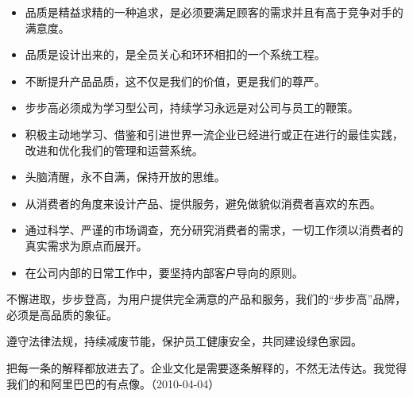 
\begin{itemize}
\item 品质是精益求精的一种追求，是必须要满足顾客的需求并且有高于竞争对手的满意度。
\item 品质是设计出来的，是全员关心和环环相扣的一个系统工程。
\item 不断提升产品品质，这不仅是我们的价值，更是我们的尊严。
\end{itemize}


\begin{itemize}
\item 步步高必须成为学习型公司，持续学习永远是对公司与员工的鞭策。
\item 积极主动地学习、借鉴和引进世界一流企业已经进行或正在进行的最佳实践，改进和优化我们的管理和运营系统。
\item 头脑清醒，永不自满，保持开放的思维。
\end{itemize}


\begin{itemize}
\item 从消费者的角度来设计产品、提供服务，避免做貌似消费者喜欢的东西。
\item 通过科学、严谨的市场调查，充分研究消费者的需求，一切工作须以消费者的真实需求为原点而展开。
\item 在公司内部的日常工作中，要坚持内部客户导向的原则。
\end{itemize}


不懈进取，步步登高，为用户提供完全满意的产品和服务，我们的“步步高”品牌，必须是高品质的象征。


遵守法律法规，持续减废节能，保护员工健康安全，共同建设绿色家园。


把每一条的解释都放进去了。企业文化是需要逐条解释的，不然无法传达。我觉得我们的和阿里巴巴的有点像。（2010-04-04）


